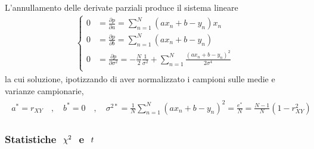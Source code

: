 \documentclass[letterpaper,10pt,italian]{jupyterBook}
\begin{document}
\sphinxAtStartPar
L’annullamento delle derivate parziali produce il sistema lineare
\begin{equation*}
\begin{split}\begin{cases}
 0 & = \frac{\partial p}{\partial a}        = \sum_{n=1}^N ( a x_n + b - y_n ) x_n \\
 0 & = \frac{\partial p}{\partial b}        = \sum_{n=1}^N ( a x_n + b - y_n ) \\
 0 & = \frac{\partial p}{\partial \sigma^2} = -\frac{N}{2}\frac{1}{\sigma^2} + \sum_{n=1}^N \frac{( a x_n + b - y_n )^2}{2 \sigma^4} \\
\end{cases}\end{split}
\end{equation*}
\sphinxAtStartPar
la cui soluzione, ipotizzando di aver normalizzato i campioni sulle medie e varianze campionarie,
\begin{equation*}
\begin{split}\begin{aligned}
  a^* = r_{XY} \quad , \quad b^* = 0 \quad , \quad \sigma^{2*} = \frac{1}{N} \sum_{n=1}^N \left( a x_n + b - y_n  \right)^2 = \frac{e^*}{N} = \frac{N-1}{N} (1 - r^2_{XY})
\end{aligned}\end{split}
\end{equation*}\subsubsection*{Statistiche \protect\(\ \chi^2 \ \protect\) e \protect\(\ t \ \protect\)}
\end{document}
